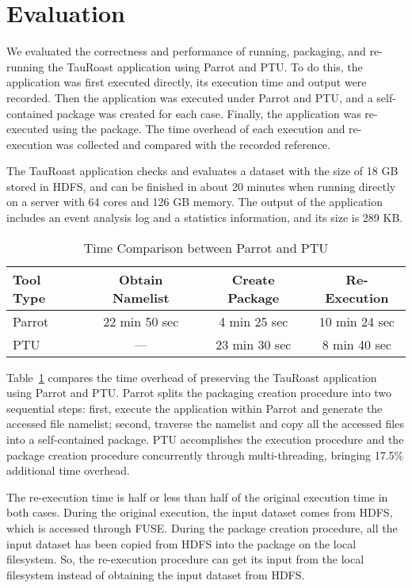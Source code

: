 \section{Evaluation}

We evaluated the correctness and performance of running, packaging, and re-running the TauRoast application using Parrot and PTU.
To do this, the application was first executed directly, its execution time and output were recorded. Then the application was executed under Parrot and PTU, and a self-contained package was created for each case. Finally, the application was re-executed using the package. The time overhead of each execution and re-execution was collected and compared with the recorded reference.

The TauRoast application checks and evaluates a dataset with the size of 18 GB stored in HDFS, and can be finished in about 20 minutes when running directly on a server with 64 cores and 126 GB memory. The output of the application includes an event analysis log and a statistics information, and its size is 289 KB.

\begin{table}
\small
    \centering
    \begin{tabular}{lccc}
    \hline
    \bf Tool Type & \bf Obtain Namelist & \bf Create Package & \bf Re-Execution \\ \hline
	Parrot & 22 min 50 sec  & 4 min 25 sec & 10 min 24 sec \\ \hline
	PTU & --- & 23 min 30 sec & 8 min 40 sec \\ \hline 
    \end{tabular}
    \normalsize
    \caption{Time Comparison between Parrot and PTU}
    \label{table:parrot_ptu}
\end{table}    

Table~\ref{table:parrot_ptu} compares the time overhead of preserving the TauRoast application using Parrot and PTU.
Parrot splits the packaging creation procedure into two sequential steps: first, execute the application within Parrot and generate the accessed file namelist; second, traverse the namelist and copy all the accessed files into a self-contained package.
PTU accomplishes the execution procedure and the package creation procedure concurrently through multi-threading, bringing 17.5\% additional time overhead.

The re-execution time is half or less than half of the original execution time in both cases. During the original execution, the input dataset comes from HDFS, which is accessed through FUSE. During the package creation procedure, all the input dataset has been copied from HDFS into the package on the local filesystem. So, the re-execution procedure can get its input from the local filesystem instead of obtaining the input dataset from HDFS.

